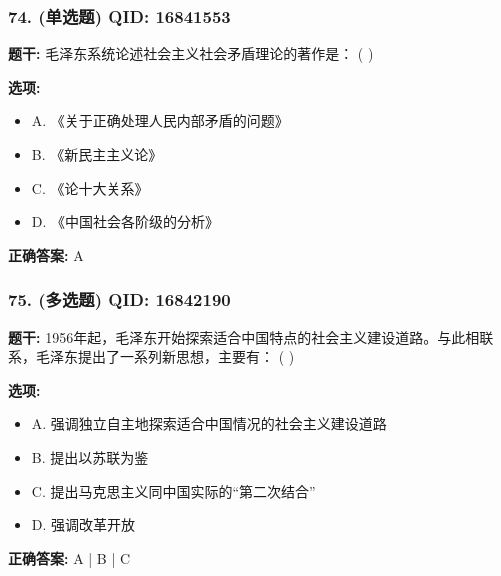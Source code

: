 \documentclass[12pt,UTF8]{ctexart}
\begin{document}
\subsubsection*{74. (单选题) \small QID: 16841553}

\textbf{题干:}
毛泽东系统论述社会主义社会矛盾理论的著作是： ( )

\textbf{选项:}
\begin{itemize}[leftmargin=*]

  \item A. 《关于正确处理人民内部矛盾的问题》

  \item B. 《新民主主义论》

  \item C. 《论十大关系》

  \item D. 《中国社会各阶级的分析》

\end{itemize}

\textbf{正确答案:}
A

\vspace{0.3em}\hrulefill\vspace{0.7em}

\subsubsection*{75. (多选题) \small QID: 16842190}

\textbf{题干:}
1956年起，毛泽东开始探索适合中国特点的社会主义建设道路。与此相联系，毛泽东提出了一系列新思想，主要有： ( )

\textbf{选项:}
\begin{itemize}[leftmargin=*]

  \item A. 强调独立自主地探索适合中国情况的社会主义建设道路

  \item B. 提出以苏联为鉴

  \item C. 提出马克思主义同中国实际的“第二次结合”

  \item D. 强调改革开放

\end{itemize}

\textbf{正确答案:}
A | B | C

\vspace{0.3em}\hrulefill\vspace{0.7em}
\end{document}
